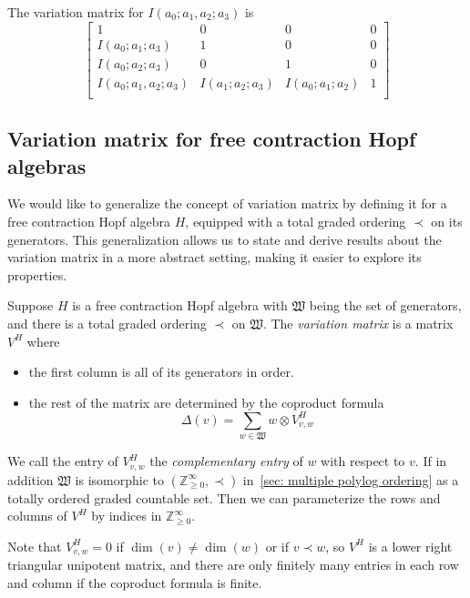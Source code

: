 \begin{example}
The variation matrix for $I(a_0;a_1,a_2;a_3)$ is
\begin{equation}
\begin{bmatrix}
1&0&0&0\\
I(a_0;a_1;a_3)&1&0&0\\
I(a_0;a_2;a_3)&0&1&0\\
I(a_0;a_1,a_2;a_3)&I(a_1;a_2;a_3)&I(a_0;a_1;a_2)&1\\
\end{bmatrix}
\end{equation}
\end{example}

\subsection{Variation matrix for free contraction Hopf algebras}

We would like to generalize the concept of variation matrix by defining it for a free contraction Hopf algebra $H$, equipped with a total graded ordering $\prec$ on its generators. This generalization allows us to state and derive results about the variation matrix in a more abstract setting, making it easier to explore its properties.

\begin{definition}
Suppose $H$ is a free contraction Hopf algebra with $\mathfrak W$ being the set of generators, and there is a total graded ordering $\prec$ on $\mathfrak W$. The \textit{variation matrix} is a matrix $V^H$ where
\begin{itemize}
\item the first column is all of its generators in order.
\item the rest of the matrix are determined by the coproduct formula
\[
\Delta(v)=\sum_{w\in\mathfrak W}w\otimes V^H_{v,w}
\]
\end{itemize}
We call the entry of $V^H_{v,w}$ the \textit{complementary entry} of $w$ with respect to $v$. If in addition $\mathfrak W$ is isomorphic to $(\mathbb Z^{\infty}_{\geq0},\prec)$ in~\ref{sec: multiple polylog ordering} as a totally ordered graded countable set. Then we can parameterize the rows and columns of $V^H$ by indices in $\mathbb Z^{\infty}_{\geq0}$.
\end{definition}

\begin{remark}
Note that $V^H_{v,w}=0$ if $\dim(v)\neq\dim(w)$ or if $v\prec w$, so $V^H$ is a lower right triangular unipotent matrix, and there are only finitely many entries in each row and column if the coproduct formula is finite.
\end{remark}

